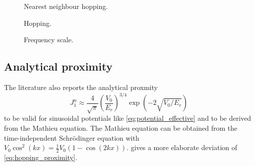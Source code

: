 \begin{figure}[htb]
  \centering
  \begin{adjustbox}{width=\textwidth}
    
  \end{adjustbox}
  \caption{Nearest neighbour hopping.
  }\label{fig:scale_hopping_nn}
\end{figure}

\begin{figure}[htb]
  \centering
  \begin{adjustbox}{width=\textwidth}
    
  \end{adjustbox}
  \caption{Hopping.
  }\label{fig:scale_hopping}
\end{figure}

\begin{figure}[htb]
  \centering
  \begin{adjustbox}{width=\textwidth}
    
  \end{adjustbox}
  \caption{Frequency scale.
  }\label{fig:scale_frequency}
\end{figure}
\subsection{Analytical proximity}

The literature \cite{Bloch2008} also reports the analytical proxmity
\begin{equation}
  J^n_1\approx
  \frac{4}{\sqrt{\pi}}\left(\frac{V_0}{E_r}\right)^{3/4}\exp(-2\sqrt{V_0/E_r})
  \label{eq:hopping_proximity}
\end{equation}
to be valid for sinusoidal potentials like \cref{eq:potential_effective} and
to be derived from the Mathieu equation. The Mathieu equation can be obtained
from the time-independent Schrödinger equation with
$V_0\cos^2(kx)=\frac{1}{2}V_0\left(1-\cos(2kx)\right)$. \cite{Connor1984}
gives a more elaborate deviation of \cref{eq:hopping_proximity}.
